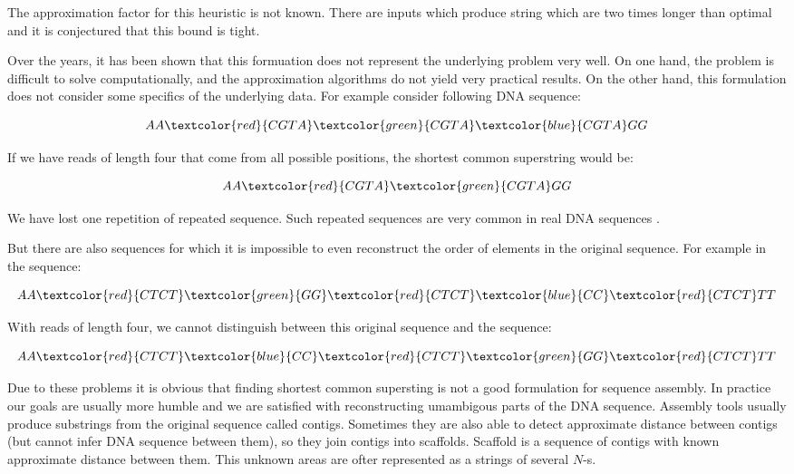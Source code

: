 The approximation factor for this heuristic is not known. There are inputs
which produce string which are two times longer than optimal
and it is conjectured that this bound is tight.

\medskip

Over the years, it has been shown
that this formuation does not represent the underlying problem very well.
On one hand, the problem is difficult to solve computationally, and the
approximation algorithms do not yield very practical results.
On the other hand, this formulation does not consider some specifics of the underlying data.
For example consider following DNA sequence:

$$AA\textcolor{red}{CGTA}\textcolor{green}{CGTA}\textcolor{blue}{CGTA}GG$$

If we have reads of length four that come from all possible positions, the shortest
common superstring would be:

$$AA\textcolor{red}{CGTA}\textcolor{green}{CGTA}GG$$

We have lost one repetition of repeated sequence. Such repeated sequences are
very common in real DNA sequences \citep{DNARep}.


But there are also sequences for which it is impossible to even 
reconstruct the order of elements
in the original sequence. For example in the sequence:

$$AA\textcolor{red}{CTCT}\textcolor{green}{GG}\textcolor{red}{CTCT}\textcolor{blue}{CC}\textcolor{red}{CTCT}TT$$

With reads of length four, we cannot distinguish between this original sequence and
the sequence:

$$AA\textcolor{red}{CTCT}\textcolor{blue}{CC}\textcolor{red}{CTCT}\textcolor{green}{GG}\textcolor{red}{CTCT}TT$$

Due to these problems it is obvious that finding shortest common supersting
is not a good formulation for sequence assembly. 
In practice our goals are usually more humble and we are satisfied with reconstructing
umambigous parts of the DNA sequence. Assembly tools
usually produce substrings from the original sequence called contigs.
Sometimes they are also able to detect approximate distance between contigs
(but cannot infer DNA sequence between them), so they join
contigs into scaffolds. Scaffold is a sequence of contigs with known
approximate distance between them. 
This unknown areas are ofter represented as a strings of several $N$-s.

